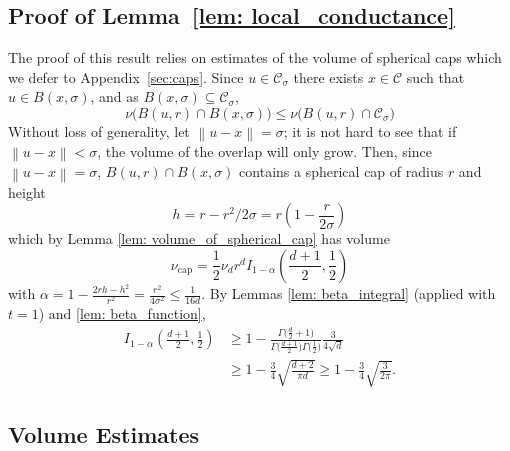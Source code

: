 \documentclass[11pt,twoside]{article}
\newcommand{\norm}[1]{\left\lVert#1\right\rVert}
\newcommand{\1}{\mathbf{1}}
\newcommand{\Cset}{\mathcal{C}}
\newcommand{\Csig}{\Cset_{\sigma}}
\newcommand{\pprspace}{{\sc PPR~}}
\begin{document}
\subsection{Proof of Lemma~\ref{lem: local_conductance}}
The proof of this result relies on estimates of the volume of spherical caps which we defer to Appendix~\ref{sec:caps}.
	Since $u \in \Csig$ there exists $x \in \Cset$ such that $u \in B(x, \sigma)$, and as $B(x,\sigma) \subseteq \Csig$,
	\begin{equation*}
	\nu\bigl(B(u, r) \cap B(x, \sigma)\bigr) \leq \nu\bigl(B(u, r) \cap \Csig \bigr)
	\end{equation*}
	Without loss of generality, let $\norm{u - x} = \sigma$; it is not hard to see that if $\norm{u - x} < \sigma$, the volume of the overlap will only grow. Then, since $\norm{u  - x} = \sigma$, $B(u, r) \cap B(x, \sigma)$ contains a spherical cap of radius $r$ and height
	\begin{equation*}
	h = r - r^2/2\sigma = r \left( 1 - \frac{r}{2 \sigma} \right)
	\end{equation*}	
	which by Lemma \ref{lem: volume_of_spherical_cap} has volume
	\begin{equation*}
	\nu_{\text{cap}} = \frac{1}{2} \nu_d r^d I_{1 - \alpha}\left( \frac{d + 1}{2}  ,\frac{1}{2}\right)
	\end{equation*}
	with $\alpha = 1 - \frac{2rh - h^2}{r^2} = \frac{r^2}{4 \sigma^2} \leq \frac{1}{16d}$. 
	By Lemmas \ref{lem: beta_integral} (applied with $t = 1$) and \ref{lem: beta_function},
	\begin{align*}
	I_{1 - \alpha}\left( \frac{d + 1}{2}  ,\frac{1}{2}\right) & \geq 1 - \frac{\Gamma\bigl(\frac{d}{2}+ 1\bigr)}{\Gamma\bigl(\frac{d + 1}{2}\bigr) \Gamma\bigl(\frac{1}{2}\bigr)} \frac{3}{4\sqrt{d}} \\
	& \geq 1 - \frac{3}{4}\sqrt{\frac{d+2}{\pi d}} \geq 1 - \frac{3}{4}\sqrt{\frac{3}{2 \pi}}.
	\end{align*}


\subsection{Volume Estimates}
\label{sec: volume_estimates}
%
\end{document}
